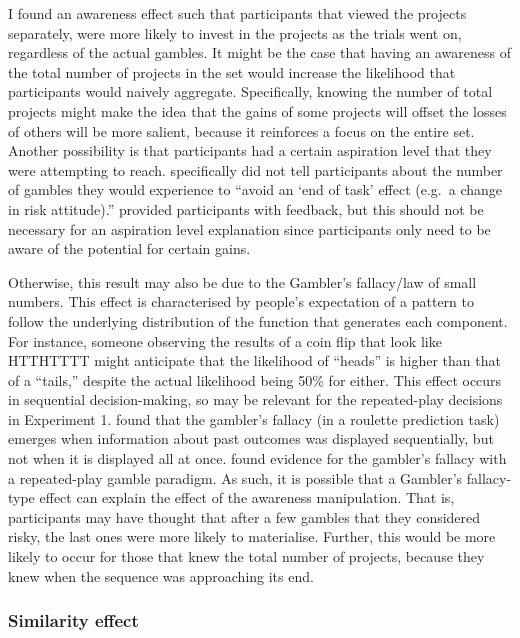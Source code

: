 \documentclass[a4paper, nobind, dvipsnames]{templates/ociamthesis}
\theoremstyle{definition}
\theoremstyle{definition}
\theoremstyle{definition}
\theoremstyle{definition}
\theoremstyle{remark}
\begin{document}
I found an awareness effect such that participants that viewed the projects
separately, were more likely to invest in the projects as the trials went on,
regardless of the actual gambles. It might be the case that having an awareness
of the total number of projects in the set would increase the likelihood that
participants would naively aggregate. Specifically, knowing the number of total
projects might make the idea that the gains of some projects will offset the
losses of others will be more salient, because it reinforces a focus on the
entire set. Another possibility is that participants had a certain aspiration
level \autocite{lopes1996} that they were attempting to reach. \textcite[p.~219]{barron2003}
specifically did not tell participants about the number of gambles they would
experience to ``avoid an `end of task' effect (e.g.~a change in risk attitude).''
\textcite{barron2003} provided participants with feedback, but this should not be
necessary for an aspiration level explanation since participants only need to be
aware of the potential for certain gains.

Otherwise, this result may also be due to the Gambler's fallacy/law of small
numbers. This effect is characterised by people's expectation of a pattern to
follow the underlying distribution of the function that generates each
component. For instance, someone observing the results of a coin flip that look
like HTTHTTTT might anticipate that the likelihood of ``heads'' is higher than
that of a ``tails,'' despite the actual likelihood being 50\% for either. This
effect occurs in sequential decision-making, so may be relevant for the
repeated-play decisions in Experiment 1. \textcite{barron2010} found that the gambler's
fallacy (in a roulette prediction task) emerges when information about past
outcomes was displayed sequentially, but not when it is displayed all at once.
\textcite{haisley2008} found evidence for the gambler's fallacy with a repeated-play
gamble paradigm. As such, it is possible that a Gambler's fallacy-type effect
can explain the effect of the awareness manipulation. That is, participants may
have thought that after a few gambles that they considered risky, the last ones
were more likely to materialise. Further, this would be more likely to occur for
those that knew the total number of projects, because they knew when the
sequence was approaching its end.

\hypertarget{similarity-discussion-aggregation-1}{%
\subsubsection{Similarity effect}\label{similarity-discussion-aggregation-1}}
\end{document}
